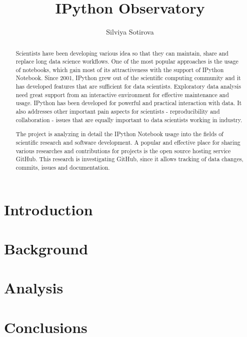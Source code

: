 \documentclass{mpaper}
\begin{document}
\title{IPython Observatory}
\author{Silviya Sotirova}

\maketitle

\begin{abstract}

Scientists have been developing various idea so that they can maintain, share and replace long data science workflows. One of the most popular approaches is the usage of notebooks, which gain most of its attractiveness with the support of IPython Notebook. Since 2001, IPython grew out of the scientific computing community and it has developed features that are sufficient for data scientists. Exploratory data analysis need great support from an interactive environment for effective maintenance and usage. IPython has been developed for powerful and practical interaction with data. It also addresses other important pain aspects for scientists - reproducibility and collaboration - issues that are equally important to data scientists working in industry.

The project is analyzing in detail the IPython Notebook usage into the fields of scientific research and software development. A popular and effective place for sharing various researches and contributions for projects is the open source hosting service GitHub. This research is investigating GitHub, since it allows tracking of data changes, commits, issues and documentation. 

\end{abstract}
\section{Introduction}



\section{Background}


\section{Analysis}



\section{Conclusions}



\end{document}
